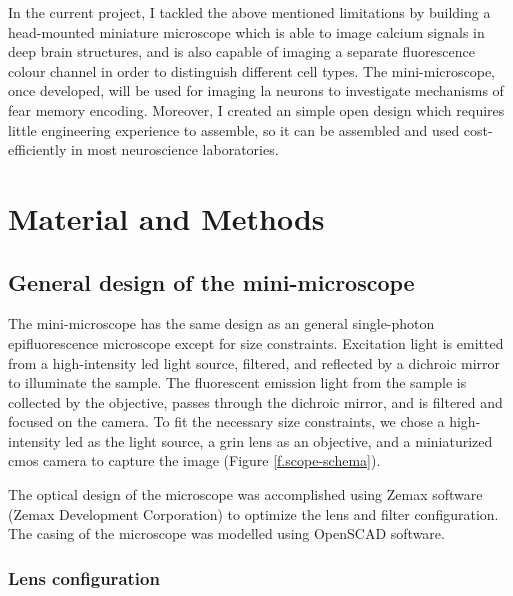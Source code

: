     In the current project, I tackled the above mentioned limitations by building a head-mounted miniature microscope which is able to image calcium signals in deep brain structures, and is also capable of imaging a separate fluorescence colour channel in order to distinguish different cell types. The mini-microscope, once developed, will be used for imaging \gls{la} neurons to investigate mechanisms of fear memory encoding. Moreover, I created an simple open design which requires little engineering experience to assemble, so it can be assembled and used cost-efficiently in most neuroscience laboratories. 

\section{Material and Methods}

\subsection{General design of the mini-microscope}

The mini-microscope has the same design as an general single-photon epifluorescence microscope except for size constraints. Excitation light is emitted from a high-intensity \gls{led} light source, filtered, and reflected by a dichroic mirror to illuminate the sample. The fluorescent emission light from the sample is collected by the objective, passes through the dichroic mirror, and is filtered and focused on the camera. To fit the necessary size constraints, we chose a high-intensity \gls{led} as the light source, a \gls{grin} lens as an objective, and a miniaturized \gls{cmos} camera to capture the image (Figure \ref{f.scope-schema}).

The optical design of the microscope was accomplished using Zemax software (Zemax Development Corporation) to optimize the lens and filter configuration. The casing of the microscope was modelled using OpenSCAD software. 

\subsubsection{Lens configuration}

